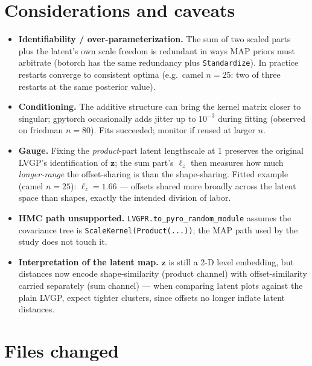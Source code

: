 \documentclass[11pt]{article}
\begin{document}
\section{Considerations and caveats}

\begin{itemize}
\item \textbf{Identifiability / over-parameterization.} The sum of two scaled parts plus the
latent's own scale freedom is redundant in ways MAP priors must arbitrate (botorch has the
same redundancy plus \texttt{Standardize}). In practice restarts converge to consistent optima
(e.g.\ camel $n{=}25$: two of three restarts at the same posterior value).
\item \textbf{Conditioning.} The additive structure can bring the kernel matrix closer to
singular; gpytorch occasionally adds jitter up to $10^{-3}$ during fitting (observed on
friedman $n{=}80$). Fits succeeded; monitor if reused at larger $n$.
\item \textbf{Gauge.} Fixing the \emph{product}-part latent lengthscale at 1 preserves the
original LVGP's identification of $\mathbf z$; the sum part's $\ell_z$ then measures how much
\emph{longer-range} the offset-sharing is than the shape-sharing. Fitted example (camel
$n{=}25$): $\ell_z = 1.66$ --- offsets shared more broadly across the latent space than
shapes, exactly the intended division of labor.
\item \textbf{HMC path unsupported.} \texttt{LVGPR.to\_pyro\_random\_module} assumes the
covariance tree is \texttt{ScaleKernel(Product(...))}; the MAP path used by the study does not
touch it.
\item \textbf{Interpretation of the latent map.} $\mathbf z$ is still a 2-D level embedding,
but distances now encode shape-similarity (product channel) with offset-similarity carried
separately (sum channel) --- when comparing latent plots against the plain LVGP, expect
tighter clusters, since offsets no longer inflate latent distances.
\end{itemize}

\section{Files changed}
\end{document}
